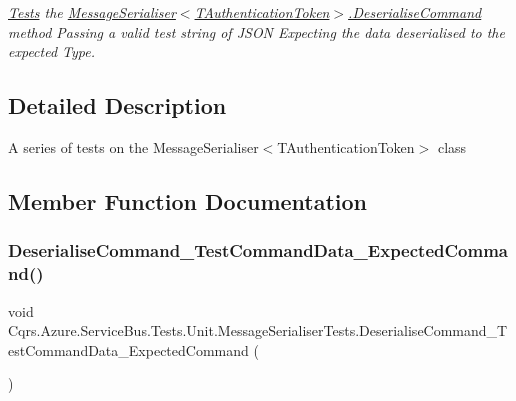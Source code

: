 \begin{DoxyCompactItemize}
\begin{DoxyCompactList}\small\item\em \hyperlink{namespaceCqrs_1_1Azure_1_1ServiceBus_1_1Tests}{Tests} the \hyperlink{classCqrs_1_1Azure_1_1ServiceBus_1_1MessageSerialiser_af08efd7ea85a4fefd54df34dd9481f95_af08efd7ea85a4fefd54df34dd9481f95}{Message\+Serialiser$<$\+T\+Authentication\+Token$>$.\+Deserialise\+Command} method Passing a valid test string of J\+S\+ON Expecting the data deserialised to the expected Type. \end{DoxyCompactList}\end{DoxyCompactItemize}


\subsection{Detailed Description}
A series of tests on the Message\+Serialiser$<$\+T\+Authentication\+Token$>$ class 



\subsection{Member Function Documentation}
\mbox{\label{classCqrs_1_1Azure_1_1ServiceBus_1_1Tests_1_1Unit_1_1MessageSerialiserTests_a33c0538a90a7ed653350ccc7d3c38f49_a33c0538a90a7ed653350ccc7d3c38f49}} 
\subsubsection{\texorpdfstring{Deserialise\+Command\+\_\+\+Test\+Command\+Data\+\_\+\+Expected\+Command()}{DeserialiseCommand\_TestCommandData\_ExpectedCommand()}}
{\footnotesize\ttfamily void Cqrs.\+Azure.\+Service\+Bus.\+Tests.\+Unit.\+Message\+Serialiser\+Tests.\+Deserialise\+Command\+\_\+\+Test\+Command\+Data\+\_\+\+Expected\+Command (\begin{DoxyParamCaption}{ }\end{DoxyParamCaption})}



